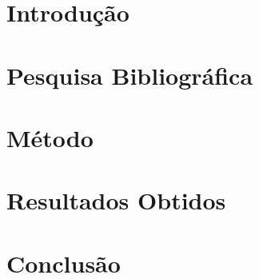 \documentclass[
	11pt,				%
	openright,			%
	twoside,			%
	a4paper,			%
	english,			%
	french,				%
	spanish,			%
	brazil				%
	]{abntex2}          %
\begin{document}
\textual

\chapter[Introdução]{Introdução}\label{cap:intro}



\chapter{Pesquisa Bibliográfica}\label{cap:pesquisa}

\minitoc


\chapter[Método]{Método}\label{cap:metodo}
\minitoc


\chapter[Resultados Obtidos]{Resultados Obtidos}\label{cap:result}
\minitoc


\chapter[Conclusão]{Conclusão}\label{cap:conclusao}

\end{document}

